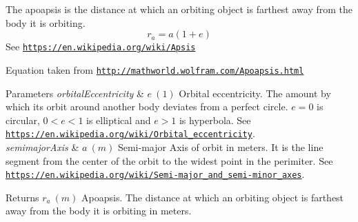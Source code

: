 The apoapsis is the distance at which an orbiting object is farthest away from the body it is orbiting. \[r_a=a(1+e)\] See \href{https://en.wikipedia.org/wiki/Apsis}{\tt https\+://en.\+wikipedia.\+org/wiki/\+Apsis}

Equation taken from \href{http://mathworld.wolfram.com/Apoapsis.html}{\tt http\+://mathworld.\+wolfram.\+com/\+Apoapsis.\+html}


\begin{DoxyParams}{Parameters}
{\em orbital\+Eccentricity} & $e\ (1)$ Orbital eccentricity. The amount by which its orbit around another body deviates from a perfect circle. $e=0$ is circular, $ 0<e<1$ is elliptical and $e>1$ is hyperbola. See \href{https://en.wikipedia.org/wiki/Orbital_eccentricity}{\tt https\+://en.\+wikipedia.\+org/wiki/\+Orbital\+\_\+eccentricity}. \\
\hline
{\em semimajor\+Axis} & $a\ (m)$ Semi-\/major Axis of orbit in meters. It is the line segment from the center of the orbit to the widest point in the perimiter. See \href{https://en.wikipedia.org/wiki/Semi-major_and_semi-minor_axes}{\tt https\+://en.\+wikipedia.\+org/wiki/\+Semi-\/major\+\_\+and\+\_\+semi-\/minor\+\_\+axes}. \\
\hline
\end{DoxyParams}
\begin{DoxyReturn}{Returns}
$r_a\ (m)$ Apoapsis. The distance at which an orbiting object is farthest away from the body it is orbiting in meters. 
\end{DoxyReturn}
